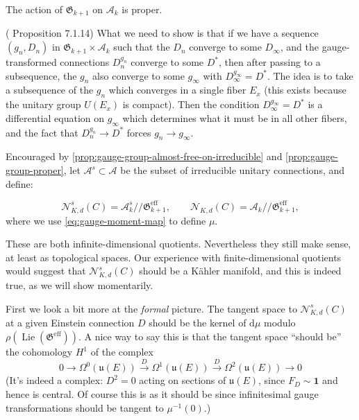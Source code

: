 \documentclass[12pt,letterpaper,reqno]{article}
\numberwithin{equation}{section}
\newcommand{\fu}{{\mathfrak u}}
\newcommand{\fG}{{\mathfrak G}}
\newcommand{\cN}{\ensuremath{\mathcal N}}
\newcommand{\cA}{\ensuremath{\mathcal A}}
\newcommand{\kahler}{K\"ahler\xspace}
\newcommand{\kq}{/\!\!/}
\newcommand\bid{{\mathbf 1}}
\newcommand{\de}{\mathrm{d}}
\newcommand{\eff}{\mathrm{eff}}
\newcommand{\ti}[1]{\textit{#1}}
\DeclareMathOperator{\Lie}{Lie}
\begin{document}
\begin{prop} \label{prop:gauge-group-proper}
The action of $\fG_{k+1}$ on $\cA_k$ is proper.
\end{prop}
\begin{pf} (\cite{MR909698} Proposition 7.1.14) What we need to show is that
if we have a sequence $(g_n, D_n)$ in $\fG_{k+1} \times \cA_k$ such that the
$D_n$ converge to some $D_\infty$, and the
gauge-transformed connections $D_n^{g_n}$ converge to some $D^*$,
then after passing to a subsequence,
the $g_n$ also converge to some $g_\infty$ with $D_\infty^{g_\infty} = D^*$.
The idea is to take a subsequence
of the $g_n$ which converges in a single fiber $E_x$ (this exists
because the unitary group $U(E_x)$ is compact). Then the condition
$D_\infty^{g_\infty} = D^*$ is a differential equation on $g_\infty$
which determines what it must be in all other fibers, and the fact
that $D_n^{g_n} \to D^*$ forces $g_n \to g_\infty$.
\end{pf}

Encouraged by \autoref{prop:gauge-group-almost-free-on-irreducible}
and \autoref{prop:gauge-group-proper}, let $\cA^s \subset \cA$ be the
subset of irreducible unitary connections, and define:

\begin{defn}
\begin{equation}
  \cN^s_{K,d}(C) = \cA^s_k \kq \fG^\eff_{k+1}, \qquad \cN_{K,d}(C) = \cA_k \kq \fG^\eff_{k+1},
\end{equation}
where we use \eqref{eq:gauge-moment-map} to define $\mu$.
\end{defn}

These are both infinite-dimensional quotients.
Nevertheless they still make sense, at least
as topological spaces. Our experience with finite-dimensional
quotients would suggest that $\cN^s_{K,d}(C)$ should be a \kahler
manifold, and this is indeed true, as we will show momentarily.

First we look a bit more at the \ti{formal} picture.
The tangent space to $\cN_{K,d}^s(C)$
at a given Einstein connection $D$ should be the kernel of $\de \mu$
modulo $\rho(\Lie (\fG^\eff))$. A nice way to say this is that
the tangent space ``should be'' the cohomology $H^1$ of the complex
\begin{equation} \label{eq:gauge-complex}
  0 \to \Omega^0(\fu(E)) \xrightarrow{D} \Omega^1(\fu(E)) \xrightarrow{D} \Omega^2(\fu(E)) \to 0
\end{equation}
(It's indeed a complex: $D^2 = 0$ acting
on sections of $\fu(E)$, since $F_D \sim \bid$ and hence
is central. Of course this is as it should be since infinitesimal
gauge transformations should be tangent to $\mu^{-1}(0)$.)
\end{document}
